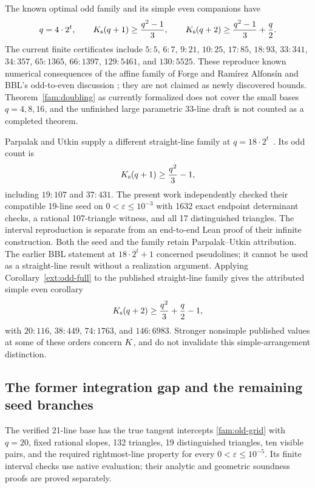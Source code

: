The known optimal odd family and its simple even companions have
\begin{equation}
 q=4\cdot2^t,\qquad
 K_{\mathrm{s}}(q+1)\geq\frac{q^2-1}{3},\qquad
 K_{\mathrm{s}}(q+2)\geq\frac{q^2-1}{3}+\frac q2.
 \label{fam:tamura}
\end{equation}
The current finite certificates include
$5:5$, $6:7$, $9:21$, $10:25$, $17:85$, $18:93$, $33:341$,
$34:357$, $65:1365$, $66:1397$, $129:5461$, and $130:5525$.
These reproduce known numerical consequences of the affine family of
Forge and Ram\'irez Alfons\'in and BBL's odd-to-even discussion
\cite{forge1998,bbl2008}; they are not claimed as newly discovered
bounds.  Theorem~\ref{fam:doubling} as currently formalized does not
cover the small bases $q=4,8,16$, and the unfinished large parametric
33-line draft is not counted as a completed theorem.

Parpalak and Utkin supply a different straight-line family at
$q=18\cdot2^t$~\cite{parpalakutkin2026}.  Its odd count is
\begin{equation}
 K_{\mathrm{s}}(q+1)\geq\frac{q^2}{3}-1,
 \label{fam:pu}
\end{equation}
including $19:107$ and $37:431$.  The present work independently checked
their compatible 19-line seed on $0<\varepsilon\leq10^{-3}$ with 1632
exact endpoint determinant checks, a rational 107-triangle witness,
and all 17 distinguished triangles.  The interval reproduction is
separate from an end-to-end Lean proof of their infinite construction.
Both the seed and the family retain Parpalak--Utkin attribution.
The earlier BBL statement at $18\cdot2^t+1$ concerned pseudolines;
it cannot be used as a straight-line result without a realization
argument.  Applying Corollary~\ref{ext:odd-full} to the published
straight-line family gives the attributed simple even corollary
\[
 K_{\mathrm{s}}(q+2)\geq\frac{q^2}{3}+\frac q2-1,
\]
with $20:116$, $38:449$, $74:1763$, and $146:6983$.  Stronger nonsimple
published values at some of these orders concern $K$, and do not
invalidate this simple-arrangement distinction.

\subsection{The former integration gap and the remaining seed branches}

The verified 21-line base has the true tangent intercepts
\eqref{fam:old-grid} with $q=20$, fixed rational slopes, 132 triangles,
19 distinguished triangles, ten visible pairs, and the required
rightmost-line property for every $0<\varepsilon\le10^{-5}$.
Its finite interval checks use native evaluation; their analytic and
geometric soundness proofs are proved separately.

